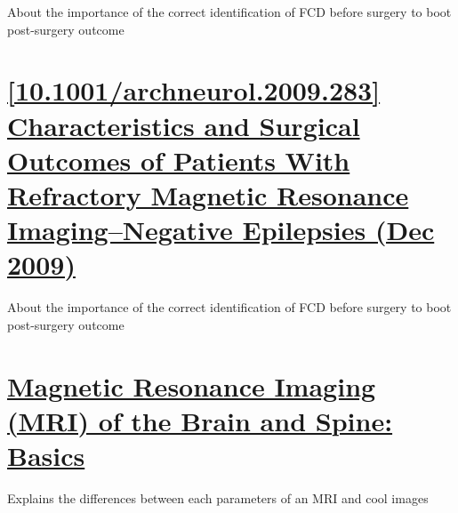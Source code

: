 About the importance of the correct identification of FCD before surgery to boot post-surgery outcome

\section{\href{https://jamanetwork.com/journals/jamaneurology/fullarticle/798793}{[10.1001/archneurol.2009.283] Characteristics and Surgical Outcomes of Patients With Refractory Magnetic Resonance Imaging–Negative Epilepsies (Dec 2009)}}

About the importance of the correct identification of FCD before surgery to boot post-surgery outcome

\section{\href{https://case.edu/med/neurology/NR/MRI%20Basics.htm}{ Magnetic Resonance Imaging (MRI) of the Brain and Spine: Basics}}

Explains the differences between each parameters of an MRI and cool images

